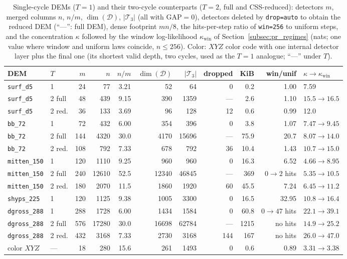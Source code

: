 \documentclass[12pt]{article}
\theoremstyle{definition}
\newcommand{\Dc}{\mathcal{D}}
\newcommand{\Tc}{\mathcal{T}_3}
\newcommand{\ttt}[1]{\texttt{#1}}
\begin{document}
\begin{table}[htbp]
\centering
\caption{Single-cycle DEMs ($T = 1$) and their two-cycle counterparts ($T = 2$, full and CSS-reduced): detectors
$m$, merged columns $n$, $n/m$, $\dim(\Dc)$, $|\Tc|$ (all with $\mathrm{GAP} = 0$), detectors deleted by
\ttt{drop=auto} to obtain the reduced DEM (``---'': full DEM), dense footprint $m n / 8$, the hits-per-step ratio of
\ttt{win=256} to uniform steps, and the concentration $\kappa$ followed by the window log-likelihood
$\kappa_{\mathrm{win}}$ of Section~\ref{subsec:pr_regimes} (nats; one value where window and uniform laws coincide,
$n \le 256$). Color: $XYZ$ color code with one internal detector layer plus the final one (its shortest valid depth,
two cycles, used as the $T = 1$ analogue; ``---'' under $T$).}\label{tab:t1}
\smallskip
\scriptsize
\setlength{\tabcolsep}{3.5pt}
\begin{tabular}{@{}llrrrrrrrrl@{}}
\toprule
DEM & $T$ & $m$ & $n$ & $n/m$ & $\dim(\Dc)$ & $|\Tc|$ & dropped & KiB & win/unif & $\kappa \to \kappa_{\mathrm{win}}$ \\
\midrule
\ttt{surf\_d5} & 1 & 24 & 77 & 3.21 & 52 & 64 & 0 & 0.2 & 1.00 & 7.59 \\
\ttt{surf\_d5} & 2 full & 48 & 439 & 9.15 & 390 & 1359 & --- & 2.6 & 1.10 & $15.5 \to 16.5$ \\
\ttt{surf\_d5} & 2 red. & 36 & 133 & 3.69 & 96 & 128 & 12 & 0.6 & 0.99 & 12.0 \\
\ttt{bb\_72} & 1 & 72 & 432 & 6.00 & 354 & 396 & 0 & 3.8 & 1.07 & $7.47 \to 9.45$ \\
\ttt{bb\_72} & 2 full & 144 & 4320 & 30.0 & 4170 & 15696 & --- & 75.9 & 20.7 & $8.07 \to 14.0$ \\
\ttt{bb\_72} & 2 red. & 108 & 792 & 7.33 & 678 & 792 & 36 & 10.4 & 1.43 & $10.7 \to 15.0$ \\
\ttt{mitten\_150} & 1 & 120 & 1110 & 9.25 & 960 & 960 & 0 & 16.3 & 6.52 & $4.66 \to 8.95$ \\
\ttt{mitten\_150} & 2 full & 240 & 12610 & 52.5 & 12340 & 46845 & --- & 369 & $0 \to 2$ hits & $5.35 \to 10.5$ \\
\ttt{mitten\_150} & 2 red. & 180 & 2070 & 11.5 & 1860 & 1920 & 60 & 45.5 & 7.24 & $6.45 \to 11.2$ \\
\ttt{shyps\_225} & 1 & 120 & 1125 & 9.38 & 1005 & 3300 & 0 & 16.5 & 32.95 & $10.8 \to 16.4$ \\
\ttt{dgross\_288} & 1 & 288 & 1728 & 6.00 & 1434 & 1584 & 0 & 60.8 & $0 \to 47$ hits & $22.1 \to 39.1$ \\
\ttt{dgross\_288} & 2 full & 576 & 17280 & 30.0 & 16698 & 62784 & --- & 1215 & no hits & $14.9 \to 25.2$ \\
\ttt{dgross\_288} & 2 red. & 432 & 3168 & 7.33 & 2730 & 3168 & 144 & 167 & no hits & $26.0 \to 47.0$ \\
color $XYZ$ & --- & 18 & 280 & 15.6 & 261 & 1493 & 0 & 0.6 & 0.89 & $3.31 \to 3.38$ \\
\bottomrule
\end{tabular}
\end{table}
\end{document}
